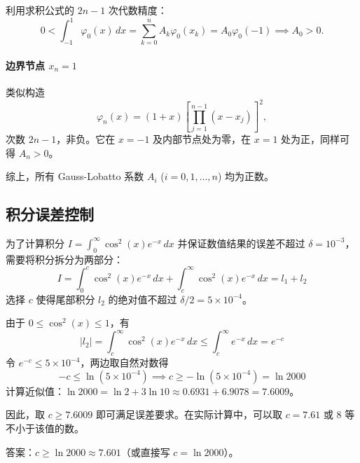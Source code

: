 \documentclass{article}
\begin{document}
利用求积公式的 \(2n-1\) 次代数精度：
\[
0 < \int_{-1}^{1} \varphi_0(x) \,dx = \sum_{k=0}^{n} A_k \varphi_0(x_k) = A_0 \varphi_0(-1) \implies A_0 > 0.
\]

\paragraph{边界节点 \(x_n = 1\)}
类似构造
\[
\varphi_n(x) = (1+x) \left[ \prod_{j=1}^{n-1} (x-x_j) \right]^2,
\]
次数 \(2n-1\)，非负。它在 \(x=-1\) 及内部节点处为零，在 \(x=1\) 处为正，同样可得 \(A_n > 0\)。

综上，所有 Gauss-Lobatto 系数 \(A_i\) (\(i=0,1,\dots,n\)) 均为正数。

\subsection*{积分误差控制}

为了计算积分 \( I = \int_0^\infty \cos^2(x) e^{-x} \, dx \) 并保证数值结果的误差不超过 \(\delta = 10^{-3}\)，需要将积分拆分为两部分：
\[
I = \int_0^c \cos^2(x) e^{-x} \, dx + \int_c^\infty \cos^2(x) e^{-x} \, dx = l_1 + l_2
\]
选择 \(c\) 使得尾部积分 \(l_2\) 的绝对值不超过 \(\delta/2 = 5 \times 10^{-4}\)。

由于 \(0 \le \cos^2(x) \le 1\)，有
\[
|l_2| = \int_c^\infty \cos^2(x) e^{-x} \, dx \le \int_c^\infty e^{-x} \, dx = e^{-c}
\]
令 \(e^{-c} \le 5 \times 10^{-4}\)，两边取自然对数得
\[
-c \le \ln(5 \times 10^{-4}) \implies c \ge -\ln(5 \times 10^{-4}) = \ln 2000
\]
计算近似值：\(\ln 2000 = \ln 2 + 3 \ln 10 \approx 0.6931 + 6.9078 = 7.6009\)。

因此，取 \(c \ge 7.6009\) 即可满足误差要求。在实际计算中，可以取 \(c = 7.61\) 或 \(8\) 等不小于该值的数。

答案：\(c \ge \ln 2000 \approx 7.601\)（或直接写 \(c = \ln 2000\)）。
\end{document}
